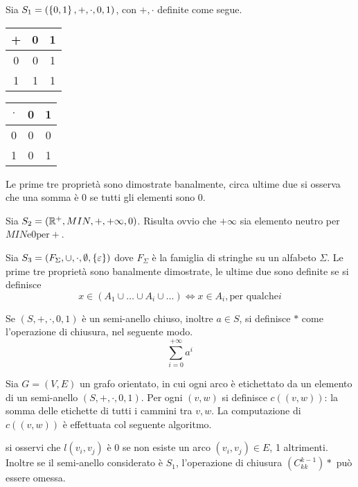 \documentclass{subfiles}
\begin{document}
\begin{Example*}
    Sia \(S_{1} = (\left\{0, 1\right\}, +, \cdot, 0, 1)\), con \(+, \cdot\) definite come segue.
    \begin{center}
        \begin{tabular}{c|c c}
            + & 0 & 1 \\
            \hline
            0 & 0 & 1 \\
            1 & 1 & 1 \\
        \end{tabular}
        \hspace{25pt}
        \begin{tabular}{c|c c}
            \(\cdot\) & 0 & 1 \\
            \hline
            0         & 0 & 0 \\
            1         & 0 & 1 \\
        \end{tabular}
    \end{center}
    Le prime tre proprietà sono dimostrate banalmente, circa ultime due si osserva che una somma è \(0\) se tutti gli elementi sono \(0\).
\end{Example*}

\begin{Example*}
    Sia \(S_{2} = (\mathbb{R}^{+}, MIN, +, +\infty, 0)\). Risulta ovvio che \(+\infty\) sia elemento neutro per \(MIN \text{e} 0 \text{per} +\).
\end{Example*}

\begin{Example*}
    Sia \(S_{3} = (F_{\Sigma}, \cup, \cdot, \emptyset, \left\{\varepsilon\right\})\) dove \(F_{\Sigma}\) è la famiglia di stringhe su un alfabeto \(\Sigma\).
    Le prime tre proprietà sono banalmente dimostrate, le ultime due sono definite se si definisce
    \[
        x \in (A_{1} \cup \ldots \cup A_{i} \cup \ldots) \iff x \in A_{i}, \text{per qualche}i
    \]
\end{Example*}

\noindent Se \((S, +, \cdot, 0, 1)\) è un semi-anello chiuso, inoltre \(a \in S\), si definisce \(*\) come l'operazione di chiusura, nel seguente modo.
\[
    \sum\limits_{i = 0}^{+\infty}{a^{i}}
\]

\noindent Sia \(G = (V, E)\) un grafo orientato, in cui ogni arco è etichettato da un elemento di un semi-anello \((S, + , \cdot, 0, 1)\).
Per ogni \((v, w)\) si definisce \(c((v, w))\): la somma delle etichette di tutti i cammini tra \(v, w\).
La computazione di \(c((v, w))\) è effettuata col seguente algoritmo.


si osservi che \(l(v_{i}, v_{j})\) è 0 se non esiste un arco \((v_{i}, v_{j}) \in E\), 1 altrimenti.
Inoltre se il semi-anello considerato è \(S_{1}\), l'operazione di chiusura \((C^{k - 1}_{kk})*\) può essere omessa.
\end{document}
